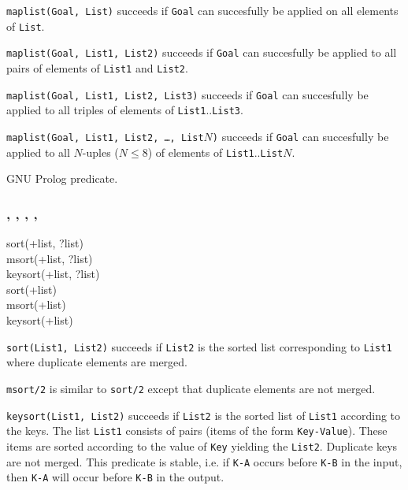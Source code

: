 \texttt{maplist(Goal, List)} succeeds if \texttt{Goal} can succesfully be
applied on all elements of \texttt{List}.

\texttt{maplist(Goal, List1, List2)} succeeds if \texttt{Goal} can succesfully be
applied to all pairs of elements of \texttt{List1} and \texttt{List2}.

\texttt{maplist(Goal, List1, List2, List3)} succeeds if \texttt{Goal} can succesfully be
applied to all triples of elements of \texttt{List1}..\texttt{List3}.

\texttt{maplist(Goal, List1, List2, \ldots, List$N$)} succeeds if \texttt{Goal} can succesfully be
applied to all $N$-uples ($N \leq 8$) of elements of \texttt{List1}..\texttt{List$N$}.

\begin{PlErrors}


\end{PlErrors}

\Portability

GNU Prolog predicate.

\subsubsection{,\label{sort/2}
               ,
               ,
               ,
               }


\begin{TemplatesOneCol}
sort(+list, ?list)\\
msort(+list, ?list)\\
keysort(+list, ?list)\\
sort(+list)\\
msort(+list)\\
keysort(+list)

\end{TemplatesOneCol}

\Description

\texttt{sort(List1, List2)} succeeds if \texttt{List2} is the
sorted list corresponding to \texttt{List1} where duplicate elements are
merged.

\texttt{msort/2} is similar to \texttt{sort/2} except that duplicate elements
are not merged.

\texttt{keysort(List1, List2)} succeeds if \texttt{List2} is the
sorted list of \texttt{List1} according to the keys. The list \texttt{List1}
consists of pairs (items of the form \texttt{Key-Value}). These items are sorted
according to the value of \texttt{Key} yielding the \texttt{List2}. Duplicate
keys are not merged. This predicate is stable, i.e. if \texttt{K-A} occurs
before \texttt{K-B} in the input, then \texttt{K-A} will occur before
\texttt{K-B} in the output.

